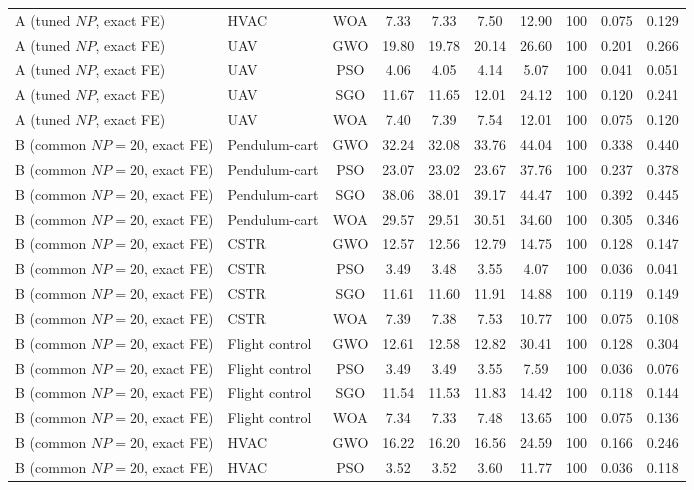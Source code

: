 \begin{table}[htbp]
{\begin{tabular}{@{}llcccccccc@{}}
A (tuned $NP$, exact FE) & HVAC & WOA & 7.33 & 7.33 & 7.50 & 12.90 & 100 & 0.075 & 0.129 \\
A (tuned $NP$, exact FE) & UAV & GWO & 19.80 & 19.78 & 20.14 & 26.60 & 100 & 0.201 & 0.266 \\
A (tuned $NP$, exact FE) & UAV & PSO & 4.06 & 4.05 & 4.14 & 5.07 & 100 & 0.041 & 0.051 \\
A (tuned $NP$, exact FE) & UAV & SGO & 11.67 & 11.65 & 12.01 & 24.12 & 100 & 0.120 & 0.241 \\
A (tuned $NP$, exact FE) & UAV & WOA & 7.40 & 7.39 & 7.54 & 12.01 & 100 & 0.075 & 0.120 \\
B (common $NP{=}20$, exact FE) & Pendulum-cart & GWO & 32.24 & 32.08 & 33.76 & 44.04 & 100 & 0.338 & 0.440 \\
B (common $NP{=}20$, exact FE) & Pendulum-cart & PSO & 23.07 & 23.02 & 23.67 & 37.76 & 100 & 0.237 & 0.378 \\
B (common $NP{=}20$, exact FE) & Pendulum-cart & SGO & 38.06 & 38.01 & 39.17 & 44.47 & 100 & 0.392 & 0.445 \\
B (common $NP{=}20$, exact FE) & Pendulum-cart & WOA & 29.57 & 29.51 & 30.51 & 34.60 & 100 & 0.305 & 0.346 \\
B (common $NP{=}20$, exact FE) & CSTR & GWO & 12.57 & 12.56 & 12.79 & 14.75 & 100 & 0.128 & 0.147 \\
B (common $NP{=}20$, exact FE) & CSTR & PSO & 3.49 & 3.48 & 3.55 & 4.07 & 100 & 0.036 & 0.041 \\
B (common $NP{=}20$, exact FE) & CSTR & SGO & 11.61 & 11.60 & 11.91 & 14.88 & 100 & 0.119 & 0.149 \\
B (common $NP{=}20$, exact FE) & CSTR & WOA & 7.39 & 7.38 & 7.53 & 10.77 & 100 & 0.075 & 0.108 \\
B (common $NP{=}20$, exact FE) & Flight control & GWO & 12.61 & 12.58 & 12.82 & 30.41 & 100 & 0.128 & 0.304 \\
B (common $NP{=}20$, exact FE) & Flight control & PSO & 3.49 & 3.49 & 3.55 & 7.59 & 100 & 0.036 & 0.076 \\
B (common $NP{=}20$, exact FE) & Flight control & SGO & 11.54 & 11.53 & 11.83 & 14.42 & 100 & 0.118 & 0.144 \\
B (common $NP{=}20$, exact FE) & Flight control & WOA & 7.34 & 7.33 & 7.48 & 13.65 & 100 & 0.075 & 0.136 \\
B (common $NP{=}20$, exact FE) & HVAC & GWO & 16.22 & 16.20 & 16.56 & 24.59 & 100 & 0.166 & 0.246 \\
B (common $NP{=}20$, exact FE) & HVAC & PSO & 3.52 & 3.52 & 3.60 & 11.77 & 100 & 0.036 & 0.118 \\

\end{tabular}}
\end{table}
